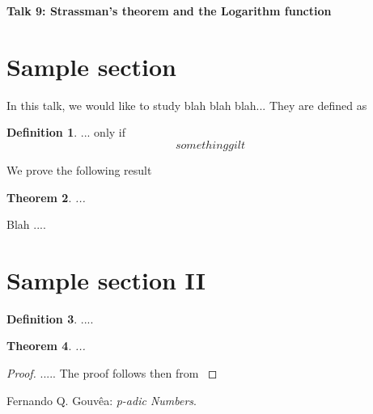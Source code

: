 \documentclass{article}
\theoremstyle{plain}
\newtheorem{thm}{Theorem}[section]
\theoremstyle{definition}
\newtheorem{defi}[thm]{Definition}
\begin{document}
\pagestyle{fancy}
\renewcommand{\footrulewidth}{0.4pt}
\fancyhead{}
\fancyfoot{}

\begin{center}
	\Huge{\textbf{Talk 9: Strassman's theorem and the Logarithm function}}%
\end{center}
	\begin{minipage}{0.45\textwidth}%
	\section{Sample section}%
			In this talk, we would like to study blah blah blah... They are defined as 
			\begin{defi}%
			  ...
			  only if $$something gilt$$
			\end{defi}
		We prove the following result
		\begin{thm}%
			...
		\end{thm}
		
		
		
				
	\end{minipage}%
	\hfill
	\begin{minipage}{0.45\textwidth}
		Blah ....
\section{Sample section II}

\begin{defi}
	....
\end{defi}		

\begin{thm}
	 ...
\end{thm}

\begin{proof}
..... The proof follows then from \cite[Prop. 3.13]{Gou} %
\end{proof}
	\end{minipage}%



\begin{thebibliography}{widest-label} %
	
	Fernando Q. Gouv\^{e}a:
	\emph{p-adic Numbers}.
	
	
\end{thebibliography}
\end{document}

